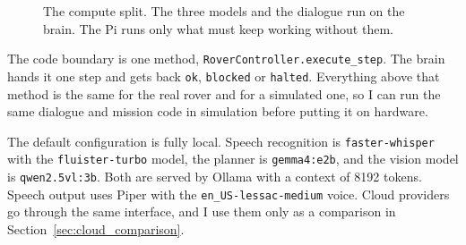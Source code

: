 \begin{figure}[htbp]
  \centering
  \caption{The compute split. The three models and the dialogue run on the brain. The Pi runs only what must keep working without them.}
  \label{fig:split}
\end{figure}

The code boundary is one method, \texttt{RoverController.execute\_step}. The brain
hands it one step and gets back \texttt{ok}, \texttt{blocked} or \texttt{halted}.
Everything above that method is the same for the real rover and for a simulated
one, so I can run the same dialogue and mission code in simulation before
putting it on hardware.

The default configuration is fully local. Speech recognition is
\texttt{faster-whisper} with the \texttt{fluister-turbo} model, the planner is
\texttt{gemma4:e2b}, and the vision model is \texttt{qwen2.5vl:3b}. Both are
served by Ollama with a context of 8192 tokens. Speech output uses Piper with the
\texttt{en\_US-lessac-medium} voice. Cloud providers go through the same
interface, and I use them only as a comparison in
Section~\ref{sec:cloud_comparison}.

